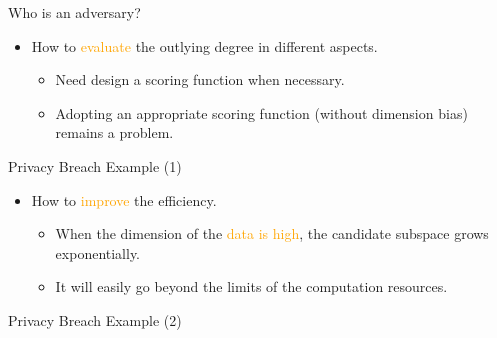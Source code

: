 \documentclass[
 size=14pt,
 paper=smartboard,  %
 mode=present, 		%
 display=slides, 	%
 style=tuliplab,  	%
 pauseslide,
 fleqn,leqno]{powerdot}
\begin{document}
\begin{slide}[toc=,bm=]{Who is an adversary?}

\begin{itemize}
\item
How to \textcolor{orange}{evaluate} the outlying degree in different aspects.

\begin{itemize}
\item
Need design a scoring function when necessary.

\item
Adopting an appropriate scoring function (without dimension bias) remains a problem.

\end{itemize}
\end{itemize}

\end{slide}


\begin{slide}[toc=,bm=]{Privacy Breach Example (1)}

\begin{itemize}
\item
How to \textcolor{orange}{improve} the efficiency.

\begin{itemize}

\item
When the dimension of the \textcolor{orange}{data is high},
the candidate subspace grows exponentially.

\item
It will easily go beyond the limits of the computation resources.

\end{itemize}
\end{itemize}

\end{slide}


\begin{slide}[toc=,bm=]{Privacy Breach Example (2)}


\end{slide}
\end{document}
